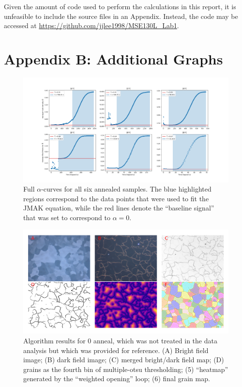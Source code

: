 \documentclass[12pt, titlepage]{article}
\begin{document}
Given the amount of code used to perform the calculations in this report, it is unfeasible to include the source files in an Appendix.  Instead, the code may be accessed at \url{https://github.com/jjlee1998/MSE130L_Lab1}.

\section{Appendix B: Additional Graphs}

	\begin{figure}[h]
		\centering
		\includegraphics[width=1.0\linewidth]{jmak_2.png}
		\caption{Full $\alpha$-curves for all six annealed samples. The blue highlighted regions correspond to the data points that were used to fit the JMAK equation, while the red lines denote the ``baseline signal'' that was set to correspond to $\alpha = 0$.}
		\label{fig:jmak_2}
	\end{figure}

	\begin{figure}[h]
		\centering
		\includegraphics[width=1.0\linewidth]{microstructure_0C.png}
		\caption{Algorithm results for 0  anneal, which was not treated in the data analysis but which was provided for reference. (A) Bright field image; (B) dark field image; (C) merged bright/dark field map; (D) grains as the fourth bin of multiple-otsu thresholding; (5) ``heatmap'' generated by the ``weighted opening'' loop; (6) final grain map.}
		\label{fig:micro_0C}
	\end{figure}
\end{document}
